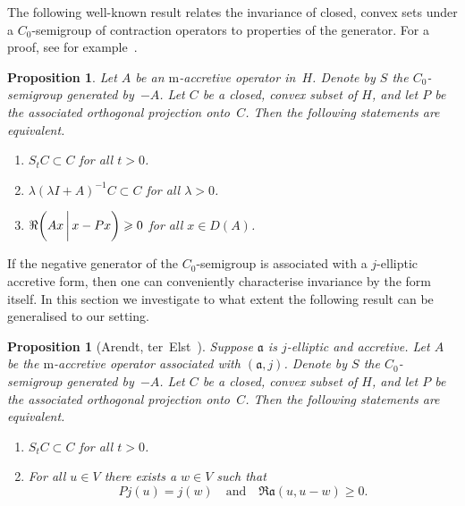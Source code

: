 \documentclass[a4paper,oneside,12pt]{amsart}
\theoremstyle{plain}
\newtheorem{proposition}[theorem]{Proposition}
\theoremstyle{definition}
\let\ge=\geqslant
\begin{document}
The following well-known result relates the invariance of closed, convex sets under a $C_0$-semigroup of contraction operators to properties of the generator.
For a proof, see for example~\cite[Theorem~2.2 and Proposition~2.3]{Ouh96}.
\begin{proposition}\label{prop:inv-S-op}
Let $A$ be an {\ensuremath{\text{m}}}-accretive operator in~$H$. Denote by $S$ the $C_0$-semigroup generated by~$-A$. Let $C$ be a closed, convex subset of $H$,
and let $P$ be the associated orthogonal projection onto~$C$.
Then the following statements are equivalent.
\begin{enumerate}[\upshape (i)]
\item $S_tC\subset C$ for all $t>0$.
\item $\lambda (\lambda I + A)^{-1}C\subset C$ for all $\lambda>0$.
\item $\Re{{\ifthenelse{\equal{auto}{auto}}{\left({Ax}\mkern3mu{\biggm|}\mkern3mu {x-Px}\right)}{}
\ifthenelse{\equal{auto}{b}}{\bigl({Ax}\mkern3mu{\biggm|}\mkern3mu {x-Px}\bigr)}{}
\ifthenelse{\equal{auto}{B}}{\Bigl({Ax}\mkern3mu{\bigm|}\mkern3mu {x-Px}\Bigr)}{}
}}\ge 0$ for all $x\in D(A)$.
\end{enumerate}
\end{proposition}

If the negative generator of the $C_0$-semigroup is associated with a $j$-elliptic accretive form,
then one can conveniently characterise invariance by the form itself.
In this section we investigate to what extent the following result can be generalised to
our setting.

\begin{proposition}[Arendt, ter~Elst~{\cite[Proposition~2.9]{AtE12:sect-form}}]\label{prop:inv-jell}
Suppose ${{\mathfrak{{a}}}}$ is $j$-elliptic and accretive. Let $A$ be the {\ensuremath{\text{m}}}-accretive operator associated with $({{\mathfrak{{a}}}},j)$.
Denote by $S$ the $C_0$-semigroup generated by~$-A$. Let $C$ be a closed, convex subset of $H$,
and let $P$ be the associated orthogonal projection onto~$C$. 
Then the following statements are equivalent.

\begin{enumerate}[\upshape (i)]
\item $S_tC\subset C$ for all $t>0$.
\item\label{en:jell-form-inv} For all $u\in V$ there exists a $w\in V$ such that
\[
    P j(u) = j(w)\quad\text{and}\quad \Re {{\mathfrak{{a}}}}(u, u - w)\ge 0.
\]
\end{enumerate}
\end{proposition}
\end{document}
